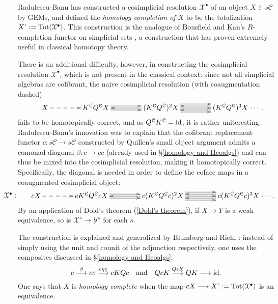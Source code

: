 \documentclass[11pt]{amsart}
\theoremstyle{plain}
\theoremstyle{definition}
\renewcommand{\to}{\longrightarrow}
\newcommand{\calY}{\mathcal{Y}}
\newcommand{\calX}{\mathcal{X}}
\newcommand{\calx}{\mathcal{X}}
\newcommand{\calc}{\mathcal{C}}
\theoremstyle{plain}
\newcommand{\Id}{\textup{id}}
\begin{document}
\begin{CPiAlgs and CHalgs}
Radulescu-Banu \cite{Radulescu-Banu.pdf} has constructed a cosimplicial resolution $\calX^\bullet$ of an object $X\in s\calc$ by GEMs, and defined the \emph{homology completion of $X$} to be the totalization $X\hat{\ }:=\textup{Tot}(\calX^\bullet)$. This construction is the analogue of Bousfield and Kan's $R$-completion functor on simplicial sets \cite{BousKanSSeq.pdf}, a construction that has proven extremely useful in classical homotopy theory.

There is an additional difficulty, however,  in constructing the cosimplicial resolution $\calX^{\bullet}$, which is not present in the classical context: since not all simplicial algebras are cofibrant, the naive cosimplicial resolution (with coaugmentation dashed)
\[\makebox[0cm][r]{\,$\qquad $}\vcenter{
\def\labelstyle{\scriptstyle}
\xymatrix@C=1.5cm@1{
X\,
\ar@{-->}[r]
&
\,K^{\calc}Q^{\calc}X\,
\ar[r];[]
&
\,(K^{\calc}Q^{\calc})^2X\,
\ar@<-.65ex>[l];[]
\ar@<+.65ex>[l];[]
\ar@<+.65ex>[r];[]
\ar@<-.65ex>[r];[]
&
\,(K^{\calc}Q^{\calc})^3X\,\makebox[0cm][l]{\,$\cdots. $}
\ar[l];[]
\ar@<-1.3ex>[l];[]
\ar@<+1.3ex>[l];[]
}}\]
fails to be homotopically correct, and  as $Q^{\calc}K^{\calc}=\Id$, it is rather uniteresting. Radulescu-Banu's innovation was to explain that the cofibrant replacement functor $c:s\calc\to s\calc$ constructed by Quillen's small object argument \cite{QuillenHomAlg.pdf} admits a comonad diagonal $\beta:c\to cc$  (already used in \S\ref{homology and Hcoalgs}) and can thus be mixed into the cosimplicial resolution, making it homotopically correct. Specifically, the diagonal is needed in order  to define the coface maps in a coaugmented cosimplicial object:
\[\makebox[0cm][r]{\,$\calX^\bullet:\qquad $}\vcenter{
\def\labelstyle{\scriptstyle}
\xymatrix@C=1.5cm@1{
cX\,
\ar@{-->}[r]
&
\,cK^{\calc}Q^{\calc}cX\,
\ar[r];[]
&
\,c(K^{\calc}Q^{\calc}c)^2X\,
\ar@<-.65ex>[l];[]
\ar@<+.65ex>[l];[]
\ar@<+.65ex>[r];[]
\ar@<-.65ex>[r];[]
&
\,c(K^{\calc}Q^{\calc}c)^3X\,\makebox[0cm][l]{\,$\cdots. $}
\ar[l];[]
\ar@<-1.3ex>[l];[]
\ar@<+1.3ex>[l];[]
}}\]
By an application of Dold's theorem (\ref{Dold's theorem}), if $X\to Y$ is a weak equivalence, so is $\calx^s\to\calY^s$ for each $s$.

The construction is explained and generalized by Blumberg and Riehl \cite[\S4]{BlumRiehlResolutions.pdf}: instead of simply using the unit and counit of the adjunction respectively, one uses the composites discussed in \S\ref{homology and Hcoalgs}:
\[c\overset{\beta}{\to}cc\overset{c\eta c}{\to}cKQc\textup{\quad and\quad }QcK\overset{Q\epsilon K}{\to}QK\to \textup{id}.\]
One says that $X$ is \emph{homology complete} when the map $cX\to X\hat{\ }:=\textup{Tot}(\calX^\bullet)$ is an equivalence.



\end{CPiAlgs and CHalgs}
\end{document}
